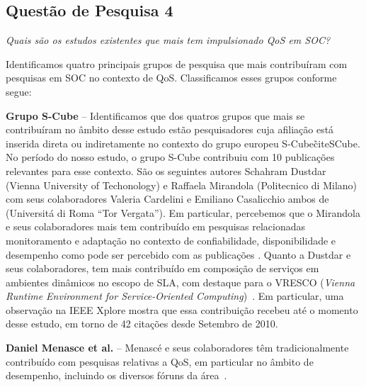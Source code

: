 \subsection{Questão de Pesquisa 4}

\emph{Quais s\~{a}o os estudos existentes que mais tem impulsionado QoS em SOC?}


Identificamos quatro principais grupos de pesquisa que mais contribu\'{i}ram com pesquisas em SOC no contexto de QoS. Classificamos esses grupos conforme segue: 

\textbf{Grupo S-Cube} -- Identificamos que dos quatros grupos que mais se contribu\'{i}ram no \^{a}mbito desse estudo est\~{a}o pesquisadores cuja afilia\c{c}\~{a}o est\'{a} inserida direta ou indiretamente no contexto do grupo europeu S-Cube\~cite{SCube}. No per\'{i}odo do nosso estudo, o grupo S-Cube contribuiu com 10 publica\c{c}\~{o}es relevantes para esse contexto. S\~{a}o os seguintes autores Schahram Dustdar (Vienna University of Techonology) e Raffaela Mirandola (Politecnico di Milano) com seus colaboradores Valeria Cardelini e Emiliano Casalicchio ambos de (Universit\'{a} di Roma ``Tor Vergata''). Em particular, percebemos que o Mirandola e seus colaboradores mais tem contribu\'{i}do em pesquisas relacionadas monitoramento e adapta\c{c}\~{a}o no contexto de confiabilidade, disponibilidade e desempenho como pode ser percebido com as publica\c{c}\~{o}es \cite{Cardellini:2009:QRA:1595696.1595718, Calinescu:2011:DQM:1990772.1991012, Ardagna:2010:POS:1814581.1814611, 10.1109/TSE.2011.68, Cardellini:2009:TSD:1692867.1692870}. Quanto a Dustdar e seus colaboradores, tem mais contribu\'{i}do em composi\c{c}\~{a}o de servi\c{c}os em ambientes din\^{a}micos no escopo de SLA, com destaque para o  VRESCO (\emph{Vienna Runtime Environment for Service-Oriented Computing})~\cite{5467022}. Em particular, uma observa\c{c}\~{a}o na IEEE Xplore mostra que essa contribui\c{c}\~{a}o recebeu at\'{e} o momento desse estudo, em torno de 42 cita\c{c}\~{o}es desde Setembro de 2010.

\textbf{Daniel Menasce et al.} -- Menasc\'{e} e seus colaboradores t\^{e}m tradicionalmente contribu\'{i}do com pesquisas relativas a QoS, em particular no \^{a}mbito de desempenho, incluindo os diversos f\'{o}runs da \'{a}rea~\cite{DBLP:journals/internet/Menasce04b, DBLP:journals/pe/MenasceARRFM03, DBLP:journals/tse/MenasceG00, Menasce:2001:CPW:560806}. 

